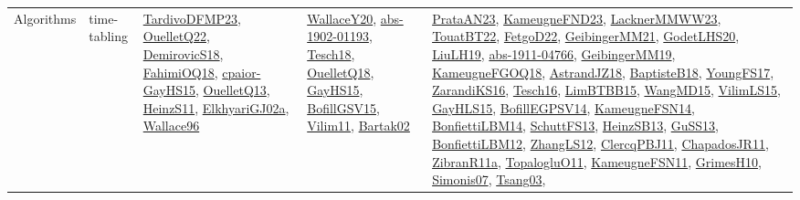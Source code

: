 {\begin{longtable}{lp{3cm}>{\raggedright}p{6cm}>{\raggedright}p{6cm}p{8cm}}
Algorithms & time-tabling & \href{papers/TardivoDFMP23.pdf}{TardivoDFMP23}\cite{TardivoDFMP23}, \href{papers/OuelletQ22.pdf}{OuelletQ22}\cite{OuelletQ22}, \href{papers/DemirovicS18.pdf}{DemirovicS18}\cite{DemirovicS18}, \href{articles/FahimiOQ18.pdf}{FahimiOQ18}\cite{FahimiOQ18}, \href{papers/cpaior-GayHS15.pdf}{cpaior-GayHS15}\cite{cpaior-GayHS15}, \href{papers/OuelletQ13.pdf}{OuelletQ13}\cite{OuelletQ13}, \href{papers/HeinzS11.pdf}{HeinzS11}\cite{HeinzS11}, \href{papers/ElkhyariGJ02a.pdf}{ElkhyariGJ02a}\cite{ElkhyariGJ02a}, \href{articles/Wallace96.pdf}{Wallace96}\cite{Wallace96} & \href{articles/WallaceY20.pdf}{WallaceY20}\cite{WallaceY20}, \href{articles/abs-1902-01193.pdf}{abs-1902-01193}\cite{abs-1902-01193}, \href{papers/Tesch18.pdf}{Tesch18}\cite{Tesch18}, \href{papers/OuelletQ18.pdf}{OuelletQ18}\cite{OuelletQ18}, \href{papers/GayHS15.pdf}{GayHS15}\cite{GayHS15}, \href{papers/BofillGSV15.pdf}{BofillGSV15}\cite{BofillGSV15}, \href{papers/Vilim11.pdf}{Vilim11}\cite{Vilim11}, \href{papers/Bartak02.pdf}{Bartak02}\cite{Bartak02} & \href{articles/PrataAN23.pdf}{PrataAN23}\cite{PrataAN23}, \href{papers/KameugneFND23.pdf}{KameugneFND23}\cite{KameugneFND23}, \href{articles/LacknerMMWW23.pdf}{LacknerMMWW23}\cite{LacknerMMWW23}, \href{papers/TouatBT22.pdf}{TouatBT22}\cite{TouatBT22}, \href{articles/FetgoD22.pdf}{FetgoD22}\cite{FetgoD22}, \href{papers/GeibingerMM21.pdf}{GeibingerMM21}\cite{GeibingerMM21}, \href{papers/GodetLHS20.pdf}{GodetLHS20}\cite{GodetLHS20}, \href{papers/LiuLH19.pdf}{LiuLH19}\cite{LiuLH19}, \href{articles/abs-1911-04766.pdf}{abs-1911-04766}\cite{abs-1911-04766}, \href{papers/GeibingerMM19.pdf}{GeibingerMM19}\cite{GeibingerMM19}, \href{papers/KameugneFGOQ18.pdf}{KameugneFGOQ18}\cite{KameugneFGOQ18}, \href{papers/AstrandJZ18.pdf}{AstrandJZ18}\cite{AstrandJZ18}, \href{articles/BaptisteB18.pdf}{BaptisteB18}\cite{BaptisteB18}, \href{papers/YoungFS17.pdf}{YoungFS17}\cite{YoungFS17}, \href{articles/ZarandiKS16.pdf}{ZarandiKS16}\cite{ZarandiKS16}, \href{papers/Tesch16.pdf}{Tesch16}\cite{Tesch16}, \href{papers/LimBTBB15.pdf}{LimBTBB15}\cite{LimBTBB15}, \href{articles/WangMD15.pdf}{WangMD15}\cite{WangMD15}, \href{papers/VilimLS15.pdf}{VilimLS15}\cite{VilimLS15}, \href{papers/GayHLS15.pdf}{GayHLS15}\cite{GayHLS15}, \href{papers/BofillEGPSV14.pdf}{BofillEGPSV14}\cite{BofillEGPSV14}, \href{articles/KameugneFSN14.pdf}{KameugneFSN14}\cite{KameugneFSN14}, \href{articles/BonfiettiLBM14.pdf}{BonfiettiLBM14}\cite{BonfiettiLBM14}, \href{papers/SchuttFS13.pdf}{SchuttFS13}\cite{SchuttFS13}, \href{articles/HeinzSB13.pdf}{HeinzSB13}\cite{HeinzSB13}, \href{papers/GuSS13.pdf}{GuSS13}\cite{GuSS13}, \href{papers/BonfiettiLBM12.pdf}{BonfiettiLBM12}\cite{BonfiettiLBM12}, \href{papers/ZhangLS12.pdf}{ZhangLS12}\cite{ZhangLS12}, \href{papers/ClercqPBJ11.pdf}{ClercqPBJ11}\cite{ClercqPBJ11}, \href{papers/ChapadosJR11.pdf}{ChapadosJR11}\cite{ChapadosJR11}, \href{papers/ZibranR11a.pdf}{ZibranR11a}\cite{ZibranR11a}, \href{articles/TopalogluO11.pdf}{TopalogluO11}\cite{TopalogluO11}, \href{papers/KameugneFSN11.pdf}{KameugneFSN11}\cite{KameugneFSN11}, \href{papers/GrimesH10.pdf}{GrimesH10}\cite{GrimesH10}, \href{articles/Simonis07.pdf}{Simonis07}\cite{Simonis07}, \href{articles/Tsang03.pdf}{Tsang03}\cite{Tsang03}, 
\end{longtable}}
